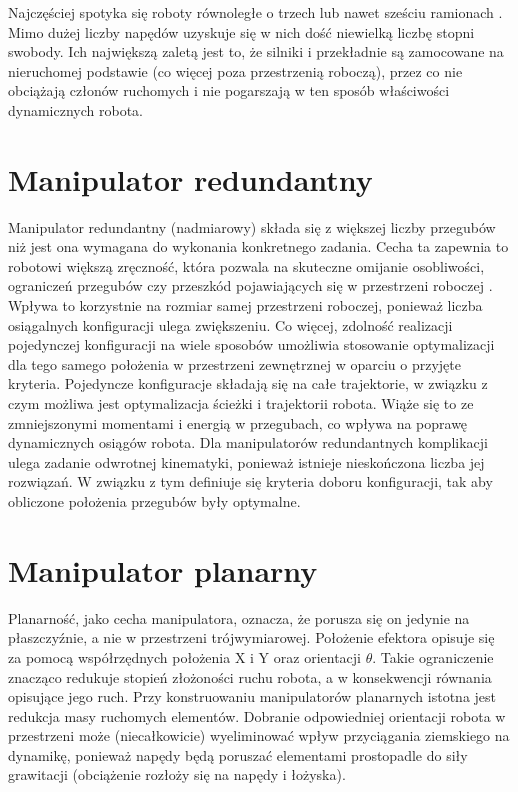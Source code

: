 \documentclass[printmode]{mgr}
\begin{document}
Najczęściej spotyka się roboty równoległe o trzech lub nawet sześciu ramionach \cite{honczarenko}. Mimo dużej liczby napędów uzyskuje
się w nich dość niewielką liczbę stopni swobody. Ich największą zaletą jest to, że silniki i przekładnie są zamocowane
na nieruchomej podstawie (co więcej poza przestrzenią roboczą), przez co nie obciążają członów ruchomych i nie pogarszają w ten sposób
właściwości dynamicznych robota. 


\section{Manipulator redundantny} \label{sec:redundantny}
Manipulator redundantny (nadmiarowy) składa się z większej liczby przegubów niż jest ona wymagana do wykonania konkretnego zadania. 
Cecha ta zapewnia to robotowi większą zręczność, która pozwala na skuteczne omijanie osobliwości, ograniczeń przegubów czy
przeszkód pojawiających się w przestrzeni roboczej \cite{handbook}. Wpływa to korzystnie na rozmiar samej przestrzeni roboczej,
ponieważ liczba osiągalnych konfiguracji ulega zwiększeniu. Co więcej, zdolność realizacji pojedynczej konfiguracji na wiele sposobów
umożliwia stosowanie optymalizacji dla tego samego położenia w przestrzeni zewnętrznej w oparciu o przyjęte kryteria. Pojedyncze
konfiguracje składają się na całe trajektorie, w związku z czym możliwa jest optymalizacja ścieżki i trajektorii robota.
Wiąże się to ze zmniejszonymi momentami i energią w przegubach,
co wpływa na poprawę dynamicznych osiągów robota. Dla manipulatorów redundantnych komplikacji ulega zadanie odwrotnej kinematyki, 
ponieważ istnieje nieskończona liczba jej rozwiązań. W związku z tym definiuje się kryteria doboru konfiguracji, 
tak aby obliczone położenia przegubów były optymalne. 


\section{Manipulator planarny}
Planarność, jako cecha manipulatora, oznacza, że porusza się on jedynie na płaszczyźnie, a nie w przestrzeni trójwymiarowej.
Położenie efektora opisuje się za pomocą współrzędnych położenia X i Y oraz orientacji $\theta$. Takie ograniczenie znacząco redukuje 
stopień złożoności ruchu robota, a w konsekwencji równania opisujące jego ruch. Przy konstruowaniu manipulatorów
planarnych istotna jest redukcja masy ruchomych elementów. Dobranie odpowiedniej orientacji robota w przestrzeni może
(niecałkowicie) wyeliminować wpływ przyciągania ziemskiego na dynamikę, ponieważ napędy będą poruszać elementami prostopadle do siły grawitacji
(obciążenie rozłoży się na napędy i łożyska).
\end{document}
